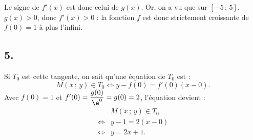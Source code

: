 Le signe de \(f'(x)\) est donc celui de \(g(x)\). Or, on a vu que sur \([-5\,;\,5]\), \(g(x) > 0\), donc \(f'(x) > 0\) : la fonction \(f\) est donc strictement croissante de \(f(0) = 1\) à plus l'infini.

\subsection*{5.}

Si \(T_0\) est cette tangente, on sait qu'une équation de \(T_0\) est :
\[
M(x\,;\,y) \in T_0 \iff y - f(0) = f'(0)(x - 0).
\]
Avec \(f(0) = 1\) et \(f'(0) = \dfrac{g(0)}{\e^0}= g(0) = 2\), l'équation devient :
\begin{align*}
&M(x\,;\,y) \in T_0 \\
\iff &y - 1 = 2(x - 0) \\
\iff &y = 2x + 1.
\end{align*}
